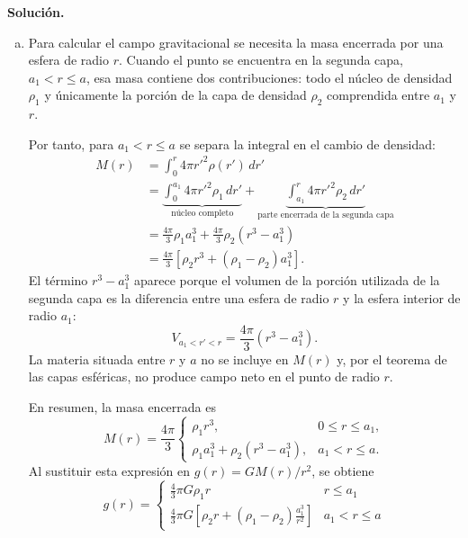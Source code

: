 \textbf{Solución.}
\begin{enumerate}[a)]
    \item Para calcular el campo gravitacional se necesita la masa encerrada por una esfera de radio $r$. Cuando el punto se encuentra en la segunda capa, $a_1<r\leq a$, esa masa contiene dos contribuciones: todo el núcleo de densidad $\rho_1$ y únicamente la porción de la capa de densidad $\rho_2$ comprendida entre $a_1$ y $r$.

    \figuraMasaPlanetaDosCapas

    Por tanto, para $a_1<r\leq a$ se separa la integral en el cambio de densidad:
    $$
    \begin{aligned}
    M(r)
    &=\int_0^r4\pi r'^2\rho(r')\,dr'\\
    &=\underbrace{\int_0^{a_1}4\pi r'^2\rho_1\,dr'}_{
    \text{núcleo completo}}
    +\underbrace{\int_{a_1}^{r}4\pi r'^2\rho_2\,dr'}_{
    \text{parte encerrada de la segunda capa}}\\
    &=\frac{4\pi}{3}\rho_1a_1^3
    +\frac{4\pi}{3}\rho_2\left(r^3-a_1^3\right)\\
    &=\frac{4\pi}{3}
    \left[\rho_2r^3+(\rho_1-\rho_2)a_1^3\right].
    \end{aligned}
    $$
    El término $r^3-a_1^3$ aparece porque el volumen de la porción utilizada de la segunda capa es la diferencia entre una esfera de radio $r$ y la esfera interior de radio $a_1$:
    $$
    V_{a_1<r'<r}=\frac{4\pi}{3}\left(r^3-a_1^3\right).
    $$
    La materia situada entre $r$ y $a$ no se incluye en $M(r)$ y, por el teorema de las capas esféricas, no produce campo neto en el punto de radio $r$.

    En resumen, la masa encerrada es
    $$
    M(r)=\frac{4\pi}{3}
    \begin{cases}
    \rho_1r^3, & 0\leq r\leq a_1,\\[2mm]
    \rho_1a_1^3+\rho_2\left(r^3-a_1^3\right),
    & a_1<r\leq a.
    \end{cases}
    $$
    Al sustituir esta expresión en $g(r)=GM(r)/r^2$, se obtiene
    $$ g(r) = \begin{cases} \frac{4}{3}\pi G \rho_1 r & r \le a_1 \\ \frac{4}{3}\pi G \left[ \rho_2 r + (\rho_1 - \rho_2)\frac{a_1^3}{r^2} \right] & a_1 < r \le a \end{cases} $$
    

\end{enumerate}
